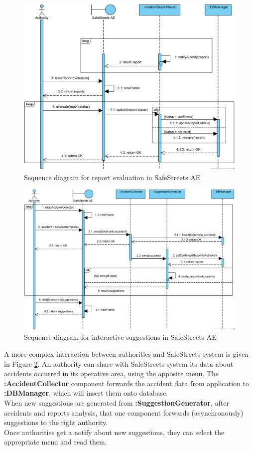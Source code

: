 \documentclass{article}
\begin{document}
			\begin{figure}[H]
				\centering
				\includegraphics [width=\textwidth] {diagrams/DD_SeqD_ReportEvaluation.png}
				\caption[Sequence diagram]{Sequence diagram for report evaluation in SafeStreets AE}
				\label{fig:sd-reportEvaluation}
			\end{figure}
			
			\begin{figure}[H]
				\centering
				\includegraphics [width=\textwidth] {diagrams/DD_SeqD_Suggestions.png}
				\caption[Sequence diagram]{Sequence diagram for interactive suggestions in SafeStreets AE}
				\label{fig:sd-suggestions}
			\end{figure}
		
			A more complex interaction between authorities and SafeStreets system is given in Figure \ref{fig:sd-suggestions}.
			An authority can share with SafeStreets system its data about accidents occurred in its operative area, using the apposite menu. The \textbf{:AccidentCollector} component forwards the accident data from application to \textbf{:DBManager}, which will insert them onto database.\\
			When new suggestions are generated from \textbf{:SuggestionGenerator}, after accidents and reports analysis, that one component forwards (asynchronously) suggestions to the right authority.\\
			Once authorities get a notify about new suggestions, they can select the appropriate menu and read them.
		
\end{document}
